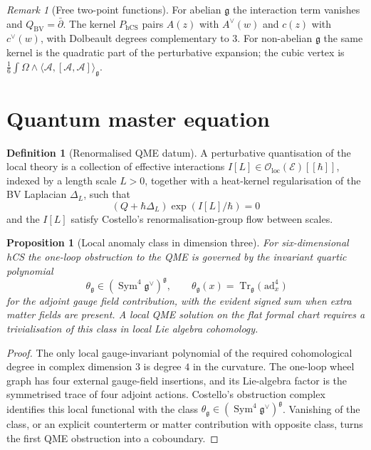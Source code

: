 \documentclass[11pt]{amsart}
\providecommand{\dbar}{\bar{\partial}}
\providecommand{\g}{\mathfrak{g}}
\providecommand{\hCS}{\mathrm{hCS}}
\providecommand{\BV}{\mathrm{BV}}
\providecommand{\Sym}{\operatorname{Sym}}
\theoremstyle{plain}
\newtheorem{proposition}[theorem]{Proposition}
\theoremstyle{definition}
\newtheorem{definition}[theorem]{Definition}
\theoremstyle{remark}
\newtheorem{remark}[theorem]{Remark}
\begin{document}
\begin{remark}[Free two-point functions]
For abelian \(\g\) the interaction term vanishes and
\(Q_{\BV}=\dbar\). The kernel \(P_{\hCS}\) pairs \(A(z)\) with
\(A^\vee(w)\) and \(c(z)\) with \(c^\vee(w)\), with Dolbeault degrees
complementary to \(3\). For non-abelian \(\g\) the same kernel is the
quadratic part of the perturbative expansion; the cubic vertex is
\(\frac{1}{6}\int\Omega\wedge\langle\mathcal A,[\mathcal A,\mathcal A]\rangle_\g\).
\end{remark}

\section{Quantum master equation}

\begin{definition}[Renormalised QME datum]
A perturbative quantisation of the local theory is a collection of
effective interactions \(I[L]\in\mathcal O_{\mathrm{loc}}(\mathcal E)[[\hbar]]\),
indexed by a length scale \(L>0\), together with a heat-kernel
regularisation of the BV Laplacian \(\Delta_L\), such that
\[
  \left(Q+\hbar\Delta_L\right)\exp(I[L]/\hbar)=0
\]
and the \(I[L]\) satisfy Costello's renormalisation-group flow between
scales.
\end{definition}

\begin{proposition}[Local anomaly class in dimension three]
For six-dimensional hCS the one-loop obstruction to the QME is governed
by the invariant quartic polynomial
\[
  \theta_{\g}\in\left(\Sym^4\g^\vee\right)^\g,
  \qquad
  \theta_{\g}(x)=\operatorname{Tr}_{\g}\bigl(\operatorname{ad}_x^4\bigr)
\]
for the adjoint gauge field contribution, with the evident signed sum
when extra matter fields are present. A local QME solution on the flat
formal chart requires a trivialisation of this class in local Lie
algebra cohomology.
\end{proposition}

\begin{proof}
The only local gauge-invariant polynomial of the required cohomological
degree in complex dimension \(3\) is degree \(4\) in the curvature. The
one-loop wheel graph has four external gauge-field insertions, and its
Lie-algebra factor is the symmetrised trace of four adjoint actions.
Costello's obstruction complex identifies this local functional with
the class \(\theta_\g\in(\Sym^4\g^\vee)^\g\). Vanishing of the class, or
an explicit counterterm or matter contribution with opposite class,
turns the first QME obstruction into a coboundary.
\end{proof}
\end{document}
